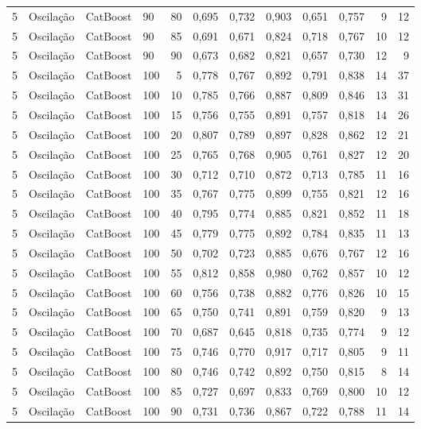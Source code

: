 \begin{longtable}{ccclrrrrrrrr}
5 & Oscilação & CatBoost & 90 & 80 & 0,695 & 0,732 & 0,903 & 0,651 & 0,757 & 9 & 12 \\
5 & Oscilação & CatBoost & 90 & 85 & 0,691 & 0,671 & 0,824 & 0,718 & 0,767 & 10 & 12 \\
5 & Oscilação & CatBoost & 90 & 90 & 0,673 & 0,682 & 0,821 & 0,657 & 0,730 & 12 & 9 \\
5 & Oscilação & CatBoost & 100 & 5 & 0,778 & 0,767 & 0,892 & 0,791 & 0,838 & 14 & 37 \\
5 & Oscilação & CatBoost & 100 & 10 & 0,785 & 0,766 & 0,887 & 0,809 & 0,846 & 13 & 31 \\
5 & Oscilação & CatBoost & 100 & 15 & 0,756 & 0,755 & 0,891 & 0,757 & 0,818 & 14 & 26 \\
5 & Oscilação & CatBoost & 100 & 20 & 0,807 & 0,789 & 0,897 & 0,828 & 0,862 & 12 & 21 \\
5 & Oscilação & CatBoost & 100 & 25 & 0,765 & 0,768 & 0,905 & 0,761 & 0,827 & 12 & 20 \\
5 & Oscilação & CatBoost & 100 & 30 & 0,712 & 0,710 & 0,872 & 0,713 & 0,785 & 11 & 16 \\
5 & Oscilação & CatBoost & 100 & 35 & 0,767 & 0,775 & 0,899 & 0,755 & 0,821 & 12 & 16 \\
5 & Oscilação & CatBoost & 100 & 40 & 0,795 & 0,774 & 0,885 & 0,821 & 0,852 & 11 & 18 \\
5 & Oscilação & CatBoost & 100 & 45 & 0,779 & 0,775 & 0,892 & 0,784 & 0,835 & 11 & 13 \\
5 & Oscilação & CatBoost & 100 & 50 & 0,702 & 0,723 & 0,885 & 0,676 & 0,767 & 12 & 16 \\
5 & Oscilação & CatBoost & 100 & 55 & 0,812 & 0,858 & 0,980 & 0,762 & 0,857 & 10 & 12 \\
5 & Oscilação & CatBoost & 100 & 60 & 0,756 & 0,738 & 0,882 & 0,776 & 0,826 & 10 & 15 \\
5 & Oscilação & CatBoost & 100 & 65 & 0,750 & 0,741 & 0,891 & 0,759 & 0,820 & 9 & 13 \\
5 & Oscilação & CatBoost & 100 & 70 & 0,687 & 0,645 & 0,818 & 0,735 & 0,774 & 9 & 12 \\
5 & Oscilação & CatBoost & 100 & 75 & 0,746 & 0,770 & 0,917 & 0,717 & 0,805 & 9 & 11 \\
5 & Oscilação & CatBoost & 100 & 80 & 0,746 & 0,742 & 0,892 & 0,750 & 0,815 & 8 & 14 \\
5 & Oscilação & CatBoost & 100 & 85 & 0,727 & 0,697 & 0,833 & 0,769 & 0,800 & 10 & 12 \\
5 & Oscilação & CatBoost & 100 & 90 & 0,731 & 0,736 & 0,867 & 0,722 & 0,788 & 11 & 14 \\

\end{longtable}

